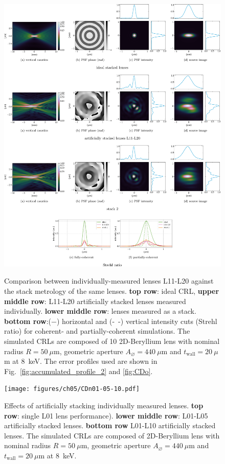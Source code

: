 \begin{refsection}
\begin{figure}[ht]
        \centering
        {\includegraphics[width=1\linewidth]{figures/ch05/CDo_vs_CDoStack.pdf}}
        \caption[Artificially stacked lenses L11-L21 vs. stack 2 comparison]{Comparison between individually-measured lenses L11-L20 against the stack metrology of the same lenses. \textbf{top row}: ideal CRL, \textbf{upper middle row}: L11-L20 artificially stacked lenses measured individually. \textbf{lower middle row}: lenses measured as a stack. \textbf{bottom row}:($-$) horizontal and (-~-) vertical intensity cuts (Strehl ratio) for coherent- and partially-coherent simulations. The simulated CRLs are composed of 10 2D-Beryllium lens with nominal radius $R=50~\mu\text{m}$, geometric aperture $A_{\diameter}=440~\mu\text{m}$ and $t_\text{wall}=20~\mu$m at 8~keV. The error profiles used are shown in Fig.~\ref{fig:accumulated_profile_2} and \ref{fig:CDo}.}\label{fig:CDo_vs_CDoStack}
\end{figure}

\begin{figure}[ht]
        \centering
        {\texttt{[image: figures/ch05/CDn01-05-10.pdf]}}
        \caption[Effects of stacking lenses]{Effects of artificially stacking individually measured lenses. \textbf{top row}: single L01 lens performance). \textbf{lower middle row}: L01-L05 artificially stacked lenses. \textbf{bottom row} L01-L10 artificially stacked lenses. The simulated CRLs are composed of 2D-Beryllium lens with nominal radius $R=50~\mu\text{m}$, geometric aperture $A_{\diameter}=440~\mu\text{m}$ and $t_\text{wall}=20~\mu$m at 8~keV.}\label{fig:CDn01-05-10}
\end{figure}


\end{refsection}

